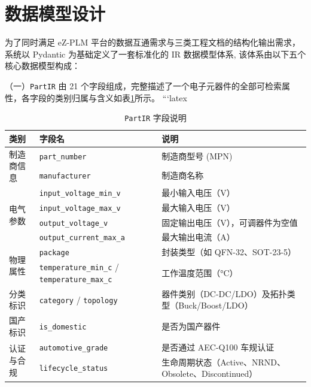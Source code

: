 \section{数据模型设计}

为了同时满足 eZ-PLM 平台的数据互通需求与三类工程文档的结构化输出需求，系统以 Pydantic 为基础定义了一套标准化的 IR 数据模型体系, 该体系由以下五个核心数据模型构成：

（一）\texttt{PartIR} 由 21 个字段组成，完整描述了一个电子元器件的全部可检索属性，各字段的类别归属与含义如表\ref{tab:partir}所示。
```latex
\begin{table}[htbp]
\centering
\caption{\texttt{PartIR} 字段说明}
\label{tab:partir}
\footnotesize
\setlength{\tabcolsep}{4pt}
\renewcommand{\arraystretch}{0.9}
\begin{tabularx}{\textwidth}{p{2cm}p{4cm}X}
\toprule
\textbf{类别} & \textbf{字段名} & \textbf{说明} \\
\midrule

\multirow{2}{*}{制造商信息}
& \texttt{part\_number} & 制造商型号 (MPN)\\
& \texttt{manufacturer} & 制造商名称 \\
\midrule

\multirow{4}{*}{电气参数}
& \texttt{input\_voltage\_min\_v} & 最小输入电压（V） \\
& \texttt{input\_voltage\_max\_v} & 最大输入电压（V） \\
& \texttt{output\_voltage\_v} & 固定输出电压（V），可调器件为空值 \\
& \texttt{output\_current\_max\_a} & 最大输出电流（A） \\
\midrule

\multirow{2}{*}{物理属性}
& \texttt{package} & 封装类型（如 QFN-32、SOT-23-5） \\
& \texttt{temperature\_min\_c} / \texttt{temperature\_max\_c} & 工作温度范围（°C） \\
\midrule

分类标识
& \texttt{category} / \texttt{topology} & 器件类别（DC-DC/LDO）及拓扑类型（Buck/Boost/LDO） \\
\midrule

国产标识
& \texttt{is\_domestic} & 是否为国产器件 \\
\midrule

\multirow{2}{*}{认证与合规}
& \texttt{automotive\_grade} & 是否通过 AEC-Q100 车规认证 \\
& \texttt{lifecycle\_status} & 生命周期状态（Active、NRND、Obsolete、Discontinued） \\
\midrule


\end{tabularx}
\end{table}
